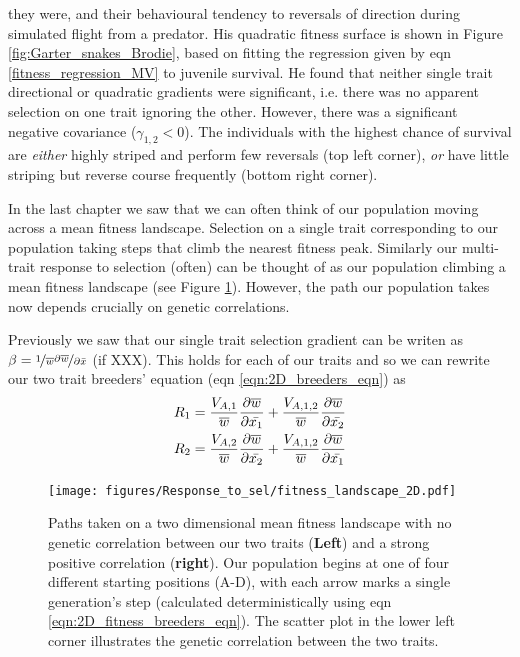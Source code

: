 they were, and their behavioural tendency to reversals of direction
during simulated flight from a predator. His quadratic fitness surface is shown in Figure
\ref{fig:Garter_snakes_Brodie}, based on fitting the
regression given by eqn \eqref{fitness_regression_MV} to juvenile
survival. He found that neither single trait directional or quadratic
gradients were significant, i.e. there was no apparent selection on one 
trait ignoring the other. However, there was a significant negative
covariance ($\gamma_{1,2}<0$). The individuals with the highest chance of survival are
{\it either} highly striped and perform few reversals (top left
corner), {\it or} have little striping but reverse course frequently
(bottom right corner). 




In the last chapter we saw that we can often think of our population moving across a mean fitness landscape. Selection on a single trait corresponding to our population taking steps that climb the nearest fitness peak. Similarly our multi-trait response to selection (often) can be thought of as our population climbing a mean fitness landscape (see Figure \ref{fig:MV_fitness_landscape}). However, the path our population takes now depends crucially on genetic correlations.

Previously we saw that our single trait selection gradient can be
writen as $\beta= \nicefrac{1}{\overline{w}} \nicefrac{\partial \overline{w}}{\partial \bar{x}} $ (if XXX). This holds for each of our traits and so we can rewrite our two trait breeders' equation (eqn \eqref{eqn:2D_breeders_eqn}) as
\begin{eqnarray}
R_1 & = \frac{V_{A,1}}{\overline{w}}  \frac{\partial \overline{w}}{\partial \bar{x_1}} + \frac{ V_{A,1,2}}{\overline{w}}  \frac{\partial \overline{w}}{\partial \bar{x_2}}  \nonumber \\
R_2 & = \frac{V_{A,2}}{\overline{w}}  \frac{\partial \overline{w}}{\partial \bar{x_2}}   +  \frac{ V_{A,1,2}}{\overline{w}}  \frac{\partial \overline{w}}{\partial \bar{x_1}}\label{eqn:2D_fitness_breeders_eqn}
\end{eqnarray}

\begin{figure}
\begin{center}
\texttt{[image: figures/Response\_to\_sel/fitness\_landscape\_2D.pdf]}
\end{center}
\caption{Paths taken on a two dimensional mean fitness landscape with
  no genetic correlation between our two traits ({\bf Left}) and a
  strong positive correlation ({\bf right}). Our
  population begins at one of four different starting positions
  (A-D), with each arrow marks a single generation's step (calculated
  deterministically using eqn
  \eqref{eqn:2D_fitness_breeders_eqn}). The scatter plot in the lower
  left corner illustrates the genetic correlation between the two traits.} \label{fig:MV_fitness_landscape} 
\end{figure}

